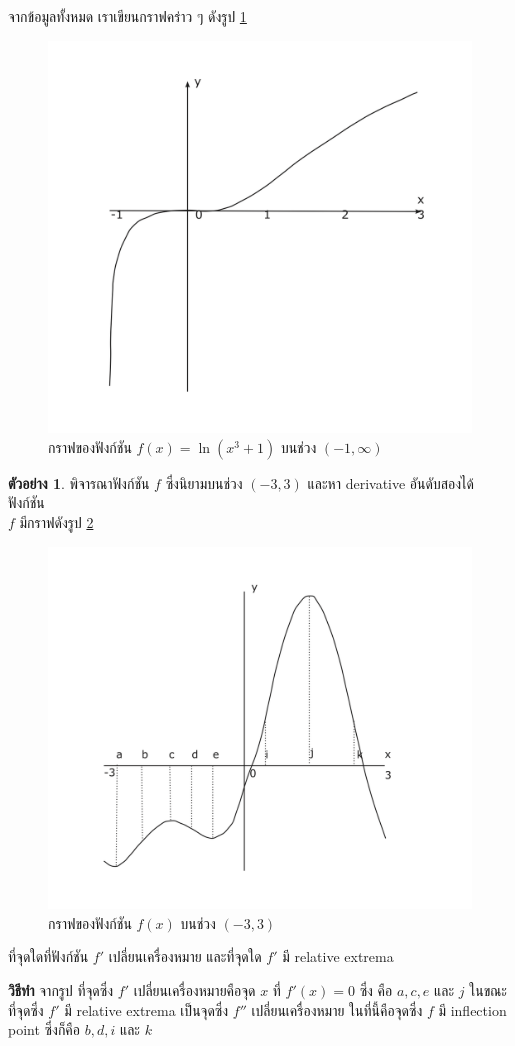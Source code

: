 \documentclass[
]{book}
\theoremstyle{definition}
\theoremstyle{definition}
\newtheorem{example}{ตัวอย่าง}[chapter]
\theoremstyle{definition}
\theoremstyle{definition}
\theoremstyle{remark}
\begin{document}
จากข้อมูลทั้งหมด เราเขียนกราฟคร่าว ๆ ดังรูป \ref{fig:graph4}

\begin{figure}

{\centering \includegraphics[width=0.5\linewidth]{images/graph4} 

}

\caption{กราฟของฟังก์ชัน $f(x) = \ln(x^3+1)$ บนช่วง $(-1,\infty)$}\label{fig:graph4}
\end{figure}

\begin{example}
พิจารณาฟังก์ชัน \(f\) ซึ่งนิยามบนช่วง \((-3,3)\) และหา derivative อันดับสองได้ ฟังก์ชัน\\
\(f\) มีกราฟดังรูป \ref{fig:graph5}

\begin{figure}

{\centering \includegraphics[width=0.5\linewidth]{images/graph5} 

}

\caption{กราฟของฟังก์ชัน $f(x)$ บนช่วง $(-3,3)$}\label{fig:graph5}
\end{figure}

ที่จุดใดที่ฟังก์ชัน \(f'\) เปลี่ยนเครื่องหมาย และที่จุดใด \(f'\) มี relative extrema
\end{example}

\textbf{วิธีทำ} จากรูป ที่จุดซึ่ง \(f'\) เปลี่ยนเครื่องหมายคือจุด \(x\) ที่ \(f'(x) = 0\) ซึ่ง คือ
\(a, c, e\) และ \(j\) ในขณะที่จุดซึ่ง \(f'\) มี relative extrema เป็นจุดซึ่ง \(f''\)
เปลี่ยนเครื่องหมาย ในที่นี้คือจุดซึ่ง \(f\) มี inflection point ซึ่งก็คือ \(b, d, i\) และ \(k\)
\end{document}
